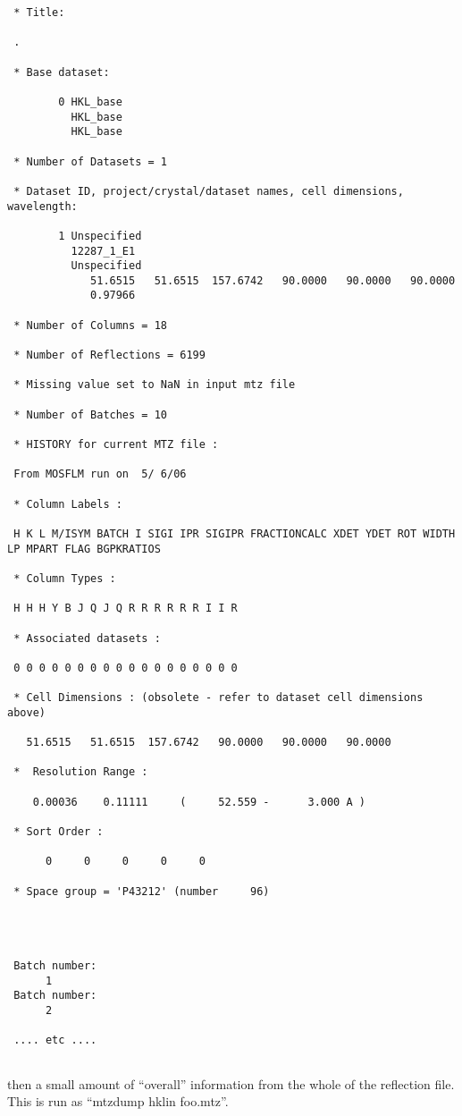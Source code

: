 \documentclass[a4paper, 11pt]{article}
\begin{document}
{
\tiny
\begin{verbatim}
 * Title:

 .

 * Base dataset:

        0 HKL_base
          HKL_base
          HKL_base

 * Number of Datasets = 1

 * Dataset ID, project/crystal/dataset names, cell dimensions, wavelength:

        1 Unspecified
          12287_1_E1
          Unspecified
             51.6515   51.6515  157.6742   90.0000   90.0000   90.0000
             0.97966

 * Number of Columns = 18

 * Number of Reflections = 6199

 * Missing value set to NaN in input mtz file

 * Number of Batches = 10

 * HISTORY for current MTZ file :

 From MOSFLM run on  5/ 6/06 

 * Column Labels :

 H K L M/ISYM BATCH I SIGI IPR SIGIPR FRACTIONCALC XDET YDET ROT WIDTH LP MPART FLAG BGPKRATIOS

 * Column Types :

 H H H Y B J Q J Q R R R R R R I I R

 * Associated datasets :

 0 0 0 0 0 0 0 0 0 0 0 0 0 0 0 0 0 0

 * Cell Dimensions : (obsolete - refer to dataset cell dimensions above)

   51.6515   51.6515  157.6742   90.0000   90.0000   90.0000 

 *  Resolution Range :

    0.00036    0.11111     (     52.559 -      3.000 A )

 * Sort Order :

      0     0     0     0     0

 * Space group = 'P43212' (number     96)

 
 
 
 Batch number: 
      1         
 Batch number: 
      2                                                                        

 .... etc ....


\end{verbatim}
}

\noindent
then a small amount of ``overall'' information from the whole of the 
reflection file. This is run as ``mtzdump hklin foo.mtz''.
\end{document}
